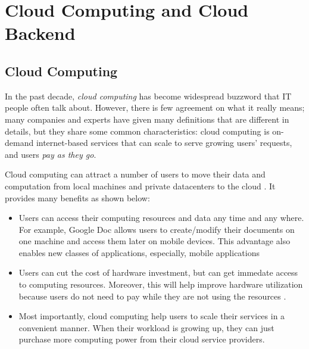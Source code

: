 \section{Cloud Computing and Cloud Backend}
\label{bg-cloud}

\subsection{Cloud Computing}

In the past decade, \textit{cloud computing} has become widespread buzzword
that IT people often talk about. However, there is few agreement on what it
really means; many companies and experts have given many definitions
\cite{TwentyoneCloudDef, IBMCloudDef, PCMagCloudDef, Foster+08-CloudAndGrid}
that are different in details, but they share some common characteristics: cloud
computing is on-demand internet-based services that can scale to serve growing
users' requests, and users \textit{pay as they go}.


Cloud computing can attract a number of users to move their data and
computation from local machines and private datacenters to the cloud
\cite{AdobeCloudStat, AWSCustomer, GmailStat, GoogleDriveStat, DropboxStat,
AstroInCloud, FacebookStat, Luo+16-BigDataBioResearch}.
It provides many benefits as shown below:
\begin{itemize}
\item Users can access their computing resources and data any time and any
where. For example, Google Doc allows users to create/modify their documents on
one machine and access them later on mobile devices. This advantage also
enables new classes of applications, especially, mobile applications
\cite{DropboxWebsite, GmailWebsite, GoogleDriveWebsite, iCloudWebsite,
SiriWebsite} 

\item Users can cut the cost of hardware investment, but can get immedate access
to computing resources. Moreover, this will help improve hardware utilization
because users do not need to pay while they are not using the resources
\cite{Marston+11-CloudBusiness}.

\item Most importantly, cloud computing help users to scale their services in a
convenient manner. When their workload is growing up, they can just purchase
more computing power from their cloud service providers.
\end{itemize}

